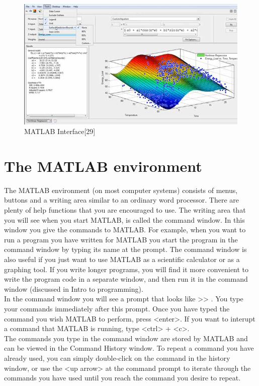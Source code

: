 \documentclass[twoside,a4paper,16pt]{book}
\begin{document}
{{ \begin{figure}[ht!]
 	\begin{center}
 		\includegraphics[width=13.0cm]{4.jpg}
 		\caption{MATLAB Interface[29]}
 	\end{center}
 \end{figure}
 \section*{The MATLAB environment} 
 The MATLAB environment (on most computer systems) consists of menus, buttons and a writing area similar to an ordinary word processor. There are plenty of help functions that you are encouraged to use. The writing area that you will see when you start MATLAB, is called the command window. In this window you give the commands to MATLAB. For example, when you want to run a program you have written for MATLAB you start the program in the command window by typing its name at the prompt. The command window is also useful if you just want to use MATLAB as a scientific calculator or as a graphing tool. If you write longer programs, you will find it more convenient to write the program code in a separate window, and then run it in the command window (discussed in Intro to programming).\\
 
 In the command window you will see a prompt that looks like >> . You type your commands immediately after this prompt. Once you have typed the command you wish MATLAB to perform, press <enter>. If you want to interupt a command that MATLAB is running, type <ctrl> + <c>.\\
 
 The commands you type in the command window are stored by MATLAB and can be viewed in the Command History window. To repeat a command you have already used, you can simply double-click on the command in the history window, or use the <up arrow> at the command prompt to iterate through the commands you have used until you reach the command you desire to repeat.\\
}}
\end{document}
